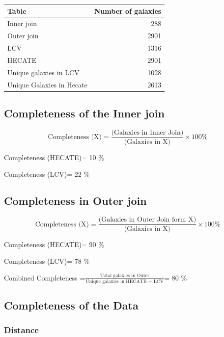 \documentclass[
]{article}
\begin{document}
\begin{longtable}[]{@{}lr@{}}
\toprule\noalign{}
Table & Number of galaxies \\
\midrule\noalign{}
\endhead
\bottomrule\noalign{}
\endlastfoot
Inner join & 288 \\
Outer join & 2901 \\
LCV & 1316 \\
HECATE & 2901 \\
Unique galaxies in LCV & 1028 \\
Unique Galaxies in Hecate & 2613 \\
\end{longtable}

\subsection{Completeness of the Inner
join}\label{completeness-of-the-inner-join}

\[
\text{Completeness (X)}=\frac{\text{(Galaxies in Inner Join)}}{\text{(Galaxies in X)}}×100\%
\]

Completeness (HECATE)= 10 \%

Completeness (LCV)= 22 \%

\subsection{Completeness in Outer
join}\label{completeness-in-outer-join}

\[
\text{Completeness (X)}=\frac{\text{(Galaxies in Outer Join form X)}}{\text{(Galaxies in X)}}×100\%
\]

Completeness (HECATE)= 90 \%

Completeness (LCV)= 78 \%

Combined Completeness
=\(\frac{\text{Total galaxies in Outer}}{\text{Unique galaxies in HECATE + LCV}}\)=
80 \%

\subsection{Completeness of the Data}\label{completeness-of-the-data}

\subsubsection{Distance}\label{distance}
\end{document}
